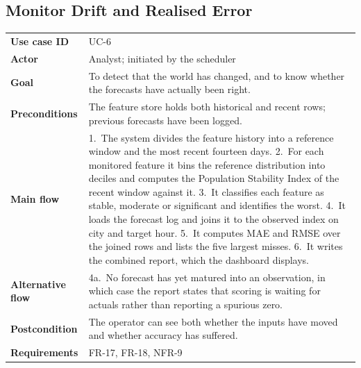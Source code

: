 \subsection{Monitor Drift and Realised Error}
\begin{xltabular}{\textwidth}{Q{2.9cm} Y}
\toprule
\bfseries Use case ID & UC-6 \\
\bfseries Actor & Analyst; initiated by the scheduler \\
\bfseries Goal & To detect that the world has changed, and to know whether the
forecasts have actually been right. \\
\bfseries Preconditions & The feature store holds both historical and recent
rows; previous forecasts have been logged. \\
\bfseries Main flow & 1.~The system divides the feature history into a reference
window and the most recent fourteen days. 2.~For each monitored feature it bins
the reference distribution into deciles and computes the Population Stability
Index of the recent window against it. 3.~It classifies each feature as stable,
moderate or significant and identifies the worst. 4.~It loads the forecast log
and joins it to the observed index on city and target hour. 5.~It computes MAE
and RMSE over the joined rows and lists the five largest misses. 6.~It writes the
combined report, which the dashboard displays. \\
\bfseries Alternative flow & 4a.~No forecast has yet matured into an observation,
in which case the report states that scoring is waiting for actuals rather than
reporting a spurious zero. \\
\bfseries Postcondition & The operator can see both whether the inputs have moved
and whether accuracy has suffered. \\
\bfseries Requirements & FR-17, FR-18, NFR-9 \\
\bottomrule
\end{xltabular}

